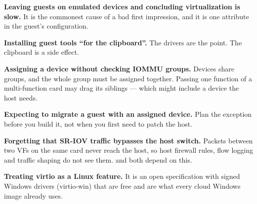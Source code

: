 \begin{pitfall}
\begin{tight}
  \item \textbf{Leaving guests on emulated devices and concluding
        virtualization is slow.} It is the commonest cause of a bad first
        impression, and it is one attribute in the guest's configuration.
  \item \textbf{Installing guest tools ``for the clipboard''.} The drivers are
        the point. The clipboard is a side effect.
  \item \textbf{Assigning a device without checking IOMMU groups.} Devices
        share groups, and the whole group must be assigned together. Passing
        one function of a multi-function card may drag its siblings --- which
        might include a device the host needs.
  \item \textbf{Expecting to migrate a guest with an assigned device.} Plan the
        exception before you build it, not when you first need to patch the
        host.
  \item \textbf{Forgetting that SR-IOV traffic bypasses the host switch.}
        Packets between two VFs on the same card never reach the host, so host
        firewall rules, flow logging and traffic shaping do not see them.
         and  both depend on this.
  \item \textbf{Treating virtio as a Linux feature.} It is an open
        specification with signed Windows drivers (virtio-win) that are free
        and are what every cloud Windows image already uses.
\end{tight}
\end{pitfall}

